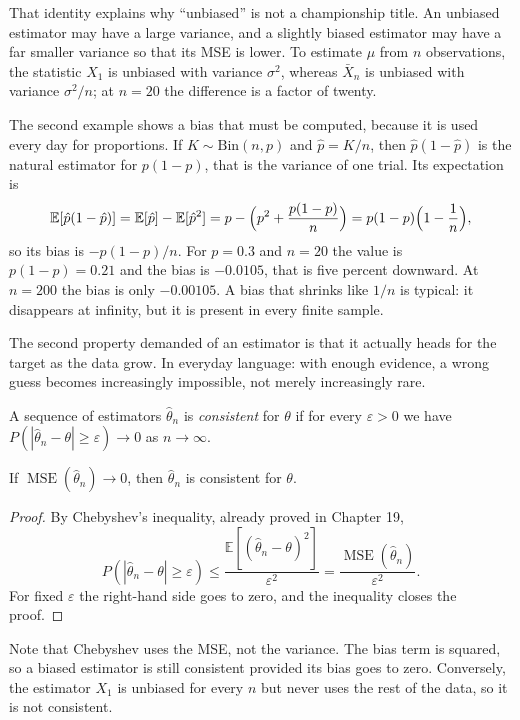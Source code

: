 That identity explains why ``unbiased'' is not a championship title. An unbiased estimator may
have a large variance, and a slightly biased estimator may have a far smaller variance so that
its MSE is lower. To estimate $\mu$ from $n$ observations, the statistic $X_1$ is unbiased with
variance $\sigma^2$, whereas $\bar X_n$ is unbiased with variance $\sigma^2/n$; at $n=20$ the
difference is a factor of twenty.

The second example shows a bias that must be computed, because it is used every day for
proportions. If $K\sim\mathrm{Bin}(n,p)$ and $\hat p=K/n$, then
$\hat p(1-\hat p)$ is the natural estimator for $p(1-p)$, that is the variance of one trial.
Its expectation is
\[
\mathbb{E}[\hat p(1-\hat p)]
=\mathbb{E}[\hat p]-\mathbb{E}[\hat p^2]
=p-\Bigl(p^2+\frac{p(1-p)}{n}\Bigr)
=p(1-p)\Bigl(1-\frac1n\Bigr),
\]
so its bias is $-p(1-p)/n$. For $p=0.3$ and $n=20$ the value is $p(1-p)=0.21$
and the bias is $-0.0105$, that is five percent downward. At $n=200$ the bias is only
$-0.00105$. A bias that shrinks like $1/n$ is typical: it disappears at infinity, but it is
present in every finite sample.

The second property demanded of an estimator is that it actually heads for the target as the
data grow. In everyday language: with enough evidence, a wrong guess becomes increasingly
impossible, not merely increasingly rare.

\begin{definisi}[Consistent]
A sequence of estimators $\hat\theta_n$ is \emph{consistent} for $\theta$ if for every
$\varepsilon>0$ we have $P(|\hat\theta_n-\theta|\ge\varepsilon)\to0$ as
$n\to\infty$.
\end{definisi}

\begin{proposisi}
If $\operatorname{MSE}(\hat\theta_n)\to0$, then $\hat\theta_n$ is consistent for
$\theta$.
\end{proposisi}

\begin{proof}[Proof]
By Chebyshev's inequality, already proved in Chapter 19,
\[
P(|\hat\theta_n-\theta|\ge\varepsilon)
\le\frac{\mathbb{E}[(\hat\theta_n-\theta)^2]}{\varepsilon^2}
=\frac{\operatorname{MSE}(\hat\theta_n)}{\varepsilon^2}.
\]
For fixed $\varepsilon$ the right-hand side goes to zero, and the inequality closes the
proof.
\end{proof}

Note that Chebyshev uses the MSE, not the variance. The bias term is squared, so a biased
estimator is still consistent provided its bias goes to zero. Conversely, the estimator $X_1$
is unbiased for every $n$ but never uses the rest of the data, so it is not consistent.


